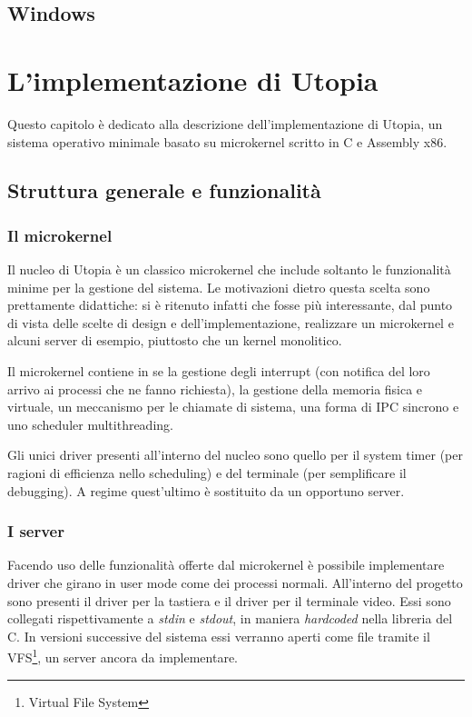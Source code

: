 \documentclass[12pt,a4paper]{report}
\begin{document}
	\section{Windows}

\chapter{L'implementazione di Utopia}
	Questo capitolo è dedicato alla descrizione dell'implementazione di Utopia, un sistema operativo
	minimale basato su microkernel scritto in C e Assembly x86.
	
	\section{Struttura generale e funzionalità}
		\subsection{Il microkernel}
			Il nucleo di Utopia è un classico microkernel che include soltanto le funzionalità minime per
			la gestione del sistema.
			Le motivazioni dietro questa scelta sono prettamente didattiche: si è ritenuto infatti che fosse
			più interessante, dal punto di vista delle scelte di design e dell'implementazione, realizzare
			un microkernel e alcuni server di esempio, piuttosto che un kernel monolitico.
		
			Il microkernel contiene in se la gestione degli interrupt (con notifica del loro arrivo ai processi
			che ne fanno richiesta), la gestione della memoria fisica e virtuale, un meccanismo per le chiamate
			di sistema, una forma di IPC sincrono e uno scheduler multithreading.
		
			Gli unici driver presenti all'interno del nucleo sono quello per il system timer (per ragioni
			di efficienza nello scheduling) e del terminale (per semplificare il debugging). A regime
			quest'ultimo è sostituito da un opportuno server.
			
		\subsection{I server}
			Facendo uso delle funzionalità offerte dal microkernel è possibile implementare driver
			che girano in user mode come dei processi normali. All'interno del progetto sono presenti
			il driver per la tastiera e il driver per il terminale video. Essi sono collegati rispettivamente
			a \emph{stdin} e \emph{stdout}, in maniera \emph{hardcoded} nella libreria del C.
			In versioni successive del sistema essi verranno aperti come file tramite il VFS\footnote{Virtual File System},
			un server ancora da implementare.
		
\end{document}
